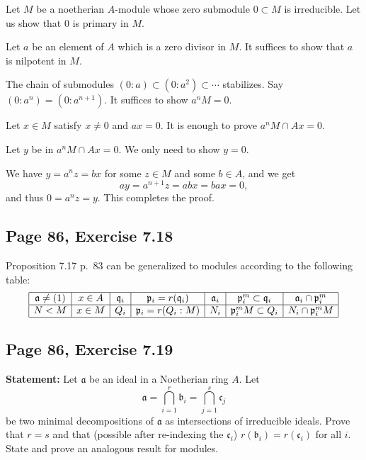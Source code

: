 \documentclass[parskip=half,fontsize=12pt]{scrartcl}%
\newcommand{\mf}{\mathfrak}
\newcommand{\aaa}{\mf a}
\newcommand{\bbb}{\mf b}
\newcommand{\ccc}{\mf c}
\newcommand{\ppp}{\mf p}
\newcommand{\qqq}{\mf q}
\begin{document}
Let $M$ be a noetherian $A$-module whose zero submodule $0\subset M$ is irreducible. Let us show that $0$ is primary in $M$. 

Let $a$ be an element of $A$ which is a zero divisor in $M$. It suffices to show that $a$ is nilpotent in $M$. 

The chain of submodules $(0:a)\subset(0:a^2)\subset\cdots$ stabilizes. Say $(0:a^n)=(0:a^{n+1})$. It suffices to show $a^nM=0$. 

Let $x\in M$ satisfy $x\ne0$ and $ax=0$. It is enough to prove $a^nM\cap Ax=0$. 

Let $y$ be in $a^nM\cap Ax=0$. We only need to show $y=0$. 

We have $y=a^nz=bx$ for some $z\in M$ and some $b\in A$, and we get 
$$
ay=a^{n+1}z=abx=bax=0,
$$ 
and thus $0=a^nz=y$. This completes the proof.%

\subsection{Page 86, Exercise 7.18}%

Proposition 7.17 p.~83 can be generalized to modules according to the following table: 
$$
\begin{array}{|c|c|c|c|c|c|c|}\hline
\aaa\ne(1)&x\in A&\qqq_i&\ppp_i=r(\qqq_i)&\aaa_i&\ppp_i^m\subset\qqq_i&\aaa_i\cap\ppp_i^m\\ \hline
N<M&x\in M&Q_i&\ppp_i=r(Q_i:M)&N_i&\ppp_i^mM\subset Q_i&N_i\cap\ppp_i^mM\\ \hline
\end{array}
$$ 

\subsection{Page 86, Exercise 7.19}%

\textbf{Statement:} Let $\aaa$ be an ideal in a Noetherian ring $A$. Let 
$$
\mathfrak{a}=\bigcap_{i=1}^r\mathfrak{b}_i=\bigcap_{j=1}^s\mathfrak{c}_j
$$ 
be two minimal decompositions of $\aaa$ as intersections of irreducible ideals. Prove that $r=s$ and that (possible after re-indexing the $\ccc_i$) $r(\bbb_i)=r(\ccc_i)$ for all $i$. State and prove an analogous result for modules.
\end{document}

